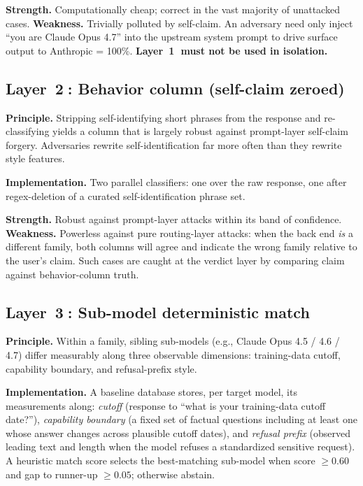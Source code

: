 \documentclass[10pt,a4paper,twocolumn]{article}
\begin{document}
\textbf{Strength.} Computationally cheap; correct in the vast majority of
unattacked cases.
\textbf{Weakness.} Trivially polluted by self-claim. An adversary need only
inject ``you are Claude Opus 4.7'' into the upstream system prompt to drive
surface output to Anthropic = 100\%. \textbf{Layer~\textcircled{1} must not be
used in isolation.}

\subsection{Layer~\textcircled{2}: Behavior column (self-claim zeroed)}\label{sec:layer2}
\textbf{Principle.} Stripping self-identifying short phrases from the response
and re-classifying yields a column that is largely robust against prompt-layer
self-claim forgery. Adversaries rewrite self-identification far more often
than they rewrite style features.

\textbf{Implementation.} Two parallel classifiers: one over the raw response,
one after regex-deletion of a curated self-identification phrase set.

\textbf{Strength.} Robust against prompt-layer attacks within its band of
confidence.
\textbf{Weakness.} Powerless against pure routing-layer attacks: when the back
end \emph{is} a different family, both columns will agree and indicate the
wrong family relative to the user's claim. Such cases are caught at the
verdict layer by comparing claim against behavior-column truth.

\subsection{Layer~\textcircled{3}: Sub-model deterministic match}\label{sec:layer3}
\textbf{Principle.} Within a family, sibling sub-models (e.g., Claude Opus 4.5
/ 4.6 / 4.7) differ measurably along three observable dimensions: training-data
cutoff, capability boundary, and refusal-prefix style.

\textbf{Implementation.} A baseline database stores, per target model, its
measurements along: \emph{cutoff} (response to ``what is your training-data
cutoff date?''), \emph{capability boundary} (a fixed set of factual questions
including at least one whose answer changes across plausible cutoff dates), and
\emph{refusal prefix} (observed leading text and length when the model refuses
a standardized sensitive request). A heuristic match score selects the
best-matching sub-model when score $\geq 0.60$ and gap to runner-up
$\geq 0.05$; otherwise abstain.
\end{document}
